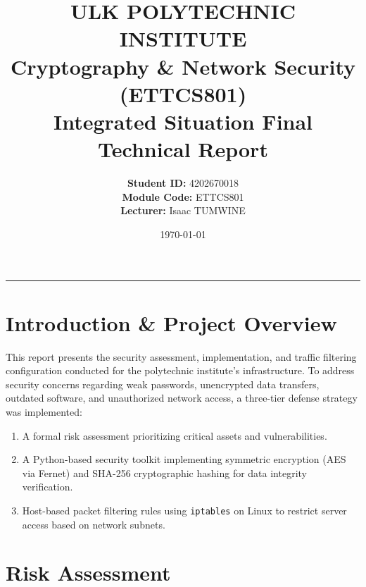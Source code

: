 \documentclass[11pt,a4paper]{article}
\title{\textbf{ULK POLYTECHNIC INSTITUTE}\\ \Large Cryptography \& Network Security (ETTCS801)\\ \large Integrated Situation Final Technical Report}
\author{\textbf{Student ID:} 4202670018 \\ \textbf{Module Code:} ETTCS801 \\ \textbf{Lecturer:} Isaac TUMWINE}
\date{\today}
\begin{document}
\maketitle

\hrule
\vspace{0.5cm}

\section{Introduction \& Project Overview}
This report presents the security assessment, implementation, and traffic filtering configuration conducted for the polytechnic institute's infrastructure. To address security concerns regarding weak passwords, unencrypted data transfers, outdated software, and unauthorized network access, a three-tier defense strategy was implemented:
\begin{enumerate}
    \item A formal risk assessment prioritizing critical assets and vulnerabilities.
    \item A Python-based security toolkit implementing symmetric encryption (AES via Fernet) and SHA-256 cryptographic hashing for data integrity verification.
    \item Host-based packet filtering rules using \texttt{iptables} on Linux to restrict server access based on network subnets.
\end{enumerate}


\section{Risk Assessment}
\end{document}
